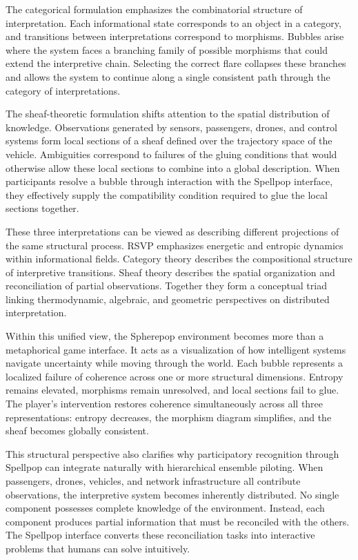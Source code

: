 \documentclass[11pt]{article}
\begin{document}
The categorical formulation emphasizes the combinatorial structure of interpretation. Each informational state corresponds to an object in a category, and transitions between interpretations correspond to morphisms. Bubbles arise where the system faces a branching family of possible morphisms that could extend the interpretive chain. Selecting the correct flare collapses these branches and allows the system to continue along a single consistent path through the category of interpretations.

The sheaf-theoretic formulation shifts attention to the spatial distribution of knowledge. Observations generated by sensors, passengers, drones, and control systems form local sections of a sheaf defined over the trajectory space of the vehicle. Ambiguities correspond to failures of the gluing conditions that would otherwise allow these local sections to combine into a global description. When participants resolve a bubble through interaction with the Spellpop interface, they effectively supply the compatibility condition required to glue the local sections together.

These three interpretations can be viewed as describing different projections of the same structural process. RSVP emphasizes energetic and entropic dynamics within informational fields. Category theory describes the compositional structure of interpretive transitions. Sheaf theory describes the spatial organization and reconciliation of partial observations. Together they form a conceptual triad linking thermodynamic, algebraic, and geometric perspectives on distributed interpretation.

Within this unified view, the Spherepop environment becomes more than a metaphorical game interface. It acts as a visualization of how intelligent systems navigate uncertainty while moving through the world. Each bubble represents a localized failure of coherence across one or more structural dimensions. Entropy remains elevated, morphisms remain unresolved, and local sections fail to glue. The player’s intervention restores coherence simultaneously across all three representations: entropy decreases, the morphism diagram simplifies, and the sheaf becomes globally consistent.

This structural perspective also clarifies why participatory recognition through Spellpop can integrate naturally with hierarchical ensemble piloting. When passengers, drones, vehicles, and network infrastructure all contribute observations, the interpretive system becomes inherently distributed. No single component possesses complete knowledge of the environment. Instead, each component produces partial information that must be reconciled with the others. The Spellpop interface converts these reconciliation tasks into interactive problems that humans can solve intuitively.
\end{document}
